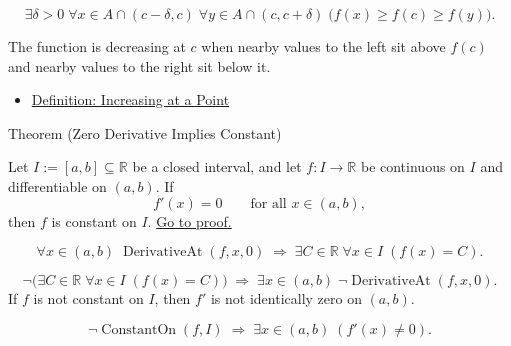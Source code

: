 \begin{remark*}
\[
\exists \delta > 0\;\forall x \in A \cap (c-\delta,c)\;\forall y \in A \cap (c,c+\delta)
\;\bigl(f(x) \geq f(c) \geq f(y)\bigr).
\]
\end{remark*}

\begin{remark*}[Interpretation]
The function is decreasing at $c$ when nearby values to the left sit above $f(c)$ and nearby values to the right sit below it.
\end{remark*}

\begin{dependencies}
\begin{itemize}
  \item \hyperref[def:increasing-at-a-point]{Definition: Increasing at a Point}
\end{itemize}
\end{dependencies}


\begin{theorembox}{Theorem (Zero Derivative Implies Constant)}
\begin{theorem}
\label{thm:zero-derivative-implies-constant}
Let $I := [a,b] \subseteq \mathbb{R}$ be a closed interval, and let $f : I \to \mathbb{R}$ be continuous on $I$ and differentiable on $(a,b)$. If
\[
f'(x) = 0 \qquad \text{for all } x \in (a,b),
\]
then $f$ is constant on $I$.
\hyperref[prf:zero-derivative-implies-constant]{Go to proof.}
\end{theorem}
\end{theorembox}

\begin{remark*}
\[
\forall x \in (a,b)\;\operatorname{DerivativeAt}(f,x,0)
\;\Rightarrow\;
\exists C \in \mathbb{R}\;\forall x \in I\;(f(x) = C).
\]
\end{remark*}

\begin{remark*}
\[
\lnot\bigl(\exists C \in \mathbb{R}\;\forall x \in I\;(f(x)=C)\bigr)
\;\Rightarrow\;
\exists x \in (a,b)\;\lnot\operatorname{DerivativeAt}(f,x,0).
\]
If $f$ is not constant on $I$, then $f'$ is not identically zero on $(a,b)$.
\end{remark*}

\begin{remark*}
\[
\lnot\operatorname{ConstantOn}(f,I) \;\Rightarrow\; \exists x \in (a,b)\;(f'(x) \neq 0).
\]
\end{remark*}

